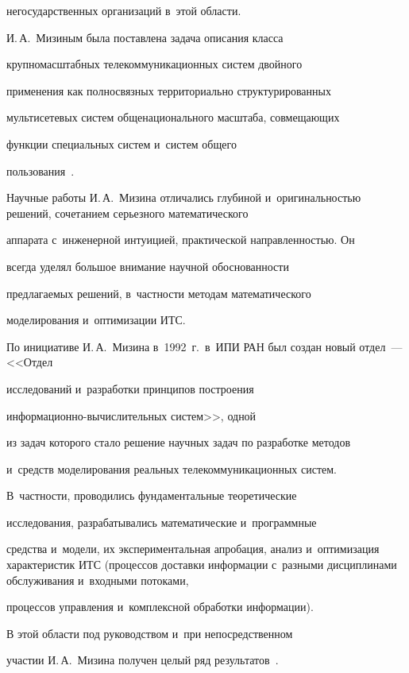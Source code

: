негосударственных организаций в~этой области.





     И.\,А.~Мизиным была поставлена задача описания класса


крупномасштабных телекоммуникационных систем двойного


применения как полносвязных территориально структурированных


мультисетевых систем общенационального масштаба, совмещающих


функции специальных систем и~систем общего


     пользования~\cite{8-miz}.





     Научные работы И.\,А.~Мизина отличались глубиной и~оригинальностью решений, сочетанием серьезного математического


аппарата с~инженерной интуицией, практической направленностью. Он


всегда уделял большое внимание научной обоснованности


предлагаемых решений, в~частности методам математического


моделирования и~оптимизации ИТС.


По инициативе И.\,А.~Мизина в~1992~г.\ в~ИПИ РАН был создан новый отдел~--- <<Отдел


исследований и~разработки принципов построения


     ин\-фор\-ма\-ци\-он\-но-вы\-чис\-ли\-тель\-ных систем>>, одной


из задач которого стало решение научных задач по разработке методов


и~средств моделирования реальных телекоммуникационных систем.


В~частности, проводились фундаментальные теоретические


исследования, разрабатывались математические и~программные


средства и~модели, их экспериментальная апробация, анализ и~оптимизация характеристик ИТС (процессов доставки информации с~разными дисциплинами обслуживания и~входными потоками,


процессов управления и~комплексной обработки информации).





     В этой области под руководством и~при непосредственном


участии И.\,А.~Мизина получен целый ряд результатов~\cite{8-miz}.


